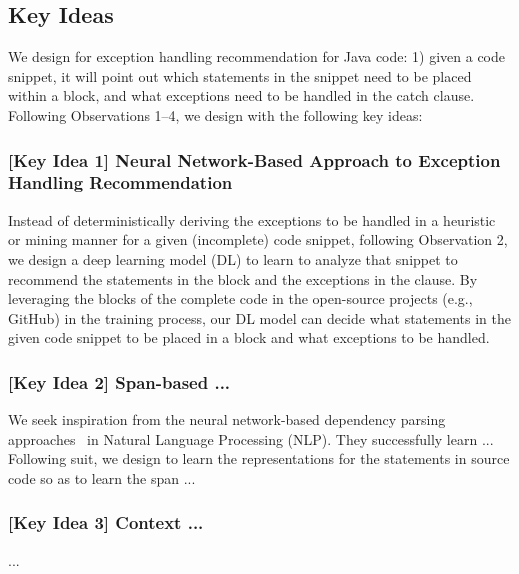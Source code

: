 \subsection{Key Ideas}
\label{key:sec}

\noindent We design {\tool} for exception handling recommendation for
Java code: 1) given a code snippet, it will point out which statements
in the snippet need to be placed within a  block, and
what exceptions need to be handled in the catch clause. Following
Observations 1--4, we design {\tool} with the following key ideas:

\subsubsection{{\bf [Key Idea 1] Neural Network-Based Approach to Exception Handling Recommendation}}
Instead of deterministically deriving the exceptions to be handled in
a heuristic or mining manner for a given (incomplete) code snippet, following
Observation 2, we design a deep learning model (DL) to learn to
analyze that snippet to recommend the statements in the
 block and the exceptions in the  clause.
By leveraging the  blocks of the complete code in the
open-source projects (e.g., GitHub) in the training process, our DL
model can decide what statements in the given code snippet to be
placed in a  block and what exceptions to be handled.


\subsubsection{{\bf [Key Idea 2] Span-based ...}}
We seek inspiration from the neural network-based dependency parsing
approaches~\cite{?} in Natural Language Processing (NLP). They
successfully learn ... Following suit, we design \tool to learn the
representations for the statements in source code so as to learn the
span ...

\vspace{2pt}
\subsubsection{{\bf [Key Idea 3] Context ...}}
...
